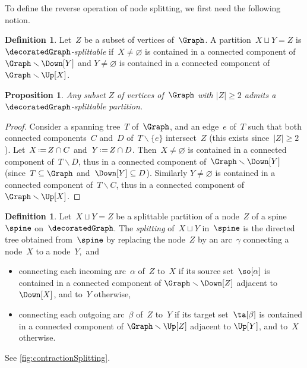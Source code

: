 \documentclass{amsart}
\newtheorem{proposition}[theorem]{Proposition}
\theoremstyle{definition}
\newtheorem{definition}[theorem]{Definition}
\newcommand{\ssm}{\smallsetminus} %
\newcommand{\eqdef}{\mbox{\,\raisebox{0.2ex}{\scriptsize\ensuremath{\mathrm:}}\ensuremath{=}\,}} %
\newcommand{\darkblue}{\color{darkblue}} %
\newcommand{\defn}[1]{\textsl{\darkblue #1}} %
\begin{document}
To define the reverse operation of node splitting, we first need the following notion.

\begin{definition}
  \label{def:splittable}
  Let~$Z$ be a subset of vertices of~$\Graph$.
  A partition~$X \sqcup Y = Z$ is \defn{$\decoratedGraph$-splittable} if~$X \ne \varnothing$ is contained in a connected component of~$\Graph \ssm \Down[Y]$ and $Y \ne \varnothing$ is contained in a connected component of~$\Graph \ssm \Up[X]$.
\end{definition}

\begin{proposition}
  \label{prop:splittablePartitions}
  Any subset $Z$ of vertices of~$\Graph$ with $|Z| \ge 2$ admits a $\decoratedGraph$-splittable partition.
\end{proposition}

\begin{proof} 
  Consider a spanning tree~$T$ of~$\Graph$, and an edge~$e$ of~$T$ such that both connected components~$C$ and~$D$ of~$T \ssm \{e\}$ intersect~$Z$ (this exists since~$|Z| \ge 2$).
  Let~$X \eqdef Z \cap C$ and~$Y \eqdef Z \cap D$.
  Then~$X \ne \varnothing$ is contained in a connected component of~$T \ssm D$, thus in a connected component of~$\Graph \ssm \Down[Y]$ (since~$T \subseteq \Graph$ and~$\Down[Y] \subseteq D$).
  Similarly $Y \ne \varnothing$ is contained in a connected component of~$T \ssm C$, thus in a connected component of~$\Graph \ssm \Up[X]$.
\end{proof}

\begin{definition}
  \label{def:nodeSplitting} 
  Let~$X \sqcup Y = Z$ be a splittable partition of a node~$Z$ of a spine~$\spine$ on~$\decoratedGraph$.
  The \defn{splitting} of~$X \sqcup Y$ in~$\spine$ is the directed tree obtained from~$\spine$ by replacing the node~$Z$ by an arc~$\gamma$ connecting a node~$X$ to a node~$Y$,~and
  \begin{itemize}
    \item connecting each incoming arc~$\alpha$ of~$Z$ to~$X$ if its source set~$\so[\alpha]$ is contained in a connected component of $\Graph \ssm \Down[Z]$ adjacent to $\Down[X]$, and to~$Y$ otherwise, 
    \item connecting each outgoing arc~$\beta$ of~$Z$ to~$Y$ if its target set~$\ta[\beta]$ is contained in a connected component of $\Graph \ssm \Up[Z]$ adjacent to $\Up[Y]$, and to~$X$ otherwise.
  \end{itemize}
  See \cref{fig:contractionSplitting}.
\end{definition}
\end{document}
